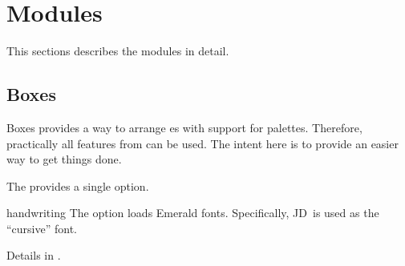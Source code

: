 \documentclass[a4paper, 11pt]{article}
\begin{document}
%
%
%
%
%
%


\section{Modules}

This sections describes the modules in detail.

\subsection{Boxes}\label{sec:boxes}

Boxes provides a way to arrange es with support for palettes. Therefore, practically all features from  can be used. The intent here is to provide an easier way to get things done.

The  provides a single option.

\begin{optiondef}{handwriting}{}{}
    The option  loads Emerald fonts. Specifically, JD\footnotemark\ is used as the ``cursive'' font.

    Details in .
\end{optiondef}
\end{document}
